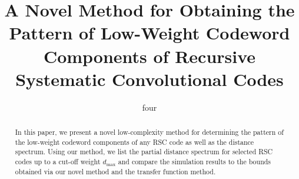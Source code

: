 \documentclass[journal,draftcls,onecolumn,12pt,twoside]{IEEEtran}
\begin{document}
\title{
A Novel Method for Obtaining the Pattern of Low-Weight Codeword Components of Recursive Systematic Convolutional Codes}
\author{%
  four
}


\maketitle
\begin{abstract}

In this paper, we present a novel low-complexity method for determining the pattern of the low-weight codeword components of any RSC code as well as the distance spectrum. 
Using our method, we list the partial distance spectrum for selected RSC codes up to a cut-off weight $d_{\text{max}}$ and compare the simulation results to the bounds obtained via our novel method and the transfer function method. 
\end{abstract}
\newpage

\newpage

\newpage

\newpage
%

\newpage

\newpage

\newpage

\newpage

\end{document}
